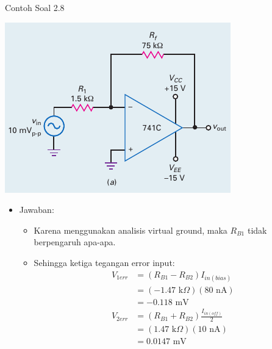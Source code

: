 \begin{frame}{Contoh Soal 2.8}
	\begin{multicols}{2}
		\begin{center}
			\includegraphics[width=\linewidth]{gambar/fig-16.17a}
		\end{center}
		\columnbreak
		\begin{itemize}
			\item Jawaban:
			\begin{itemize}
				\item Karena menggunakan analisis virtual ground, maka $ R_{B1} $ tidak berpengaruh apa-apa.
				\item Sehingga ketiga tegangan error input:
				\begin{align*}
					V_{1err} &= (R_{B1} - R_{B2})I_{in(bias)} \\
					&= ( - 1.47 \text{ k}\Omega )(80 \text{ nA}) \\
					&= -0.118 \text{ mV} \\
					V_{2err} &= (R_{B1} + R_{B2}) \frac{I_{in(off)}}{2} \\
					&= ( 1.47 \text{ k}\Omega )(10 \text{ nA}) \\
					&= 0.0147 \text{ mV} \\
				\end{align*}
			\end{itemize}
		\end{itemize}
	\end{multicols}
\end{frame}

